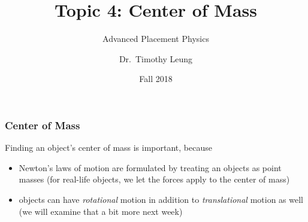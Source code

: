 \documentclass[12pt,compress,aspectratio=169]{beamer}
\title{Topic 4: Center of Mass}
\subtitle{Advanced Placement Physics}
\author[TML]{Dr.\ Timothy Leung}
\institute{Olympiads School}
\date{Fall 2018}
\begin{document}
\begin{frame}
  \maketitle
\end{frame}

%


\begin{frame}
  \frametitle{Center of Mass}
  Finding an object's center of mass is important, because
  \begin{itemize}
  \item Newton's laws of motion are formulated by treating an objects as point
    masses (for real-life objects, we let the forces apply to the center of
    mass)
  \item objects can have \emph{rotational} motion in addition to
    \emph{translational} motion as well (we will examine that a bit more
    next week)
  \end{itemize}
\end{frame}
\end{document}
